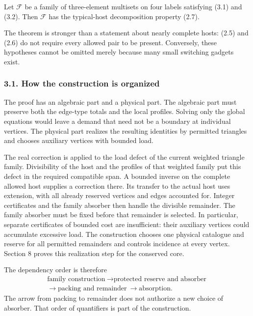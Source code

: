 \documentclass[english,11pt,a4paper]{article}
\begin{document}
Let \(\mathcal F\) be a family of three-element multisets on four labels satisfying (3.1) and (3.2). Then \(\mathcal F\) has the typical-host decomposition property (2.7).

The theorem is stronger than a statement about nearly complete hosts: (2.5) and (2.6) do not require every allowed pair to be present. Conversely, these hypotheses cannot be omitted merely because many small switching gadgets exist.

\subsubsection{3.1. How the construction is organized}\label{how-the-construction-is-organized}

The proof has an algebraic part and a physical part. The algebraic part must preserve both the edge-type totals and the local profiles. Solving only the global equations would leave a demand that need not be a boundary at individual vertices. The physical part realizes the resulting identities by permitted triangles and chooses auxiliary vertices with bounded load.

The real correction is applied to the load defect of the current weighted triangle family. Divisibility of the host and the profiles of that weighted family put this defect in the required compatible span. A bounded inverse on the complete allowed host supplies a correction there. Its transfer to the actual host uses extension, with all already reserved vertices and edges accounted for. Integer certificates and the family absorber then handle the divisible remainder. The family absorber must be fixed before that remainder is selected. In particular, separate certificates of bounded cost are insufficient: their auxiliary vertices could accumulate excessive load. The construction chooses one physical catalogue and reserve for all permitted remainders and controls incidence at every vertex. Section 8 proves this realization step for the conserved core.

The dependency order is therefore \[\begin{gathered}\text{family construction}\ \longrightarrow
\text{protected reserve and absorber}\ \\\longrightarrow
\text{packing and remainder}\ \longrightarrow
\text{absorption}.
\end{gathered}\tag{3.3}\] The arrow from packing to remainder does not authorize a new choice of absorber. That order of quantifiers is part of the construction.
\end{document}
